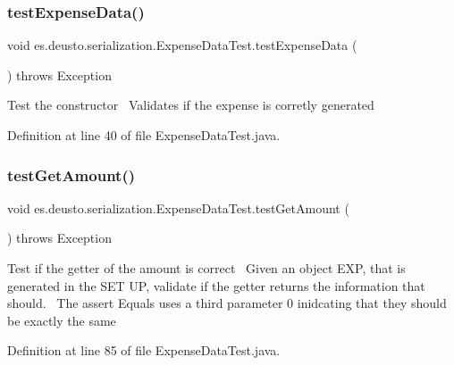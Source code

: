 \subsubsection{\texorpdfstring{test\+Expense\+Data()}{testExpenseData()}}
{\footnotesize\ttfamily void es.\+deusto.\+serialization.\+Expense\+Data\+Test.\+test\+Expense\+Data (\begin{DoxyParamCaption}{ }\end{DoxyParamCaption}) throws Exception}

Test the constructor~\newline
 Validates if the expense is corretly generated~\newline
 

Definition at line 40 of file Expense\+Data\+Test.\+java.

\mbox{\label{classes_1_1deusto_1_1serialization_1_1_expense_data_test_a23166488d596924308d8a4f800b15537}} 
\subsubsection{\texorpdfstring{test\+Get\+Amount()}{testGetAmount()}}
{\footnotesize\ttfamily void es.\+deusto.\+serialization.\+Expense\+Data\+Test.\+test\+Get\+Amount (\begin{DoxyParamCaption}{ }\end{DoxyParamCaption}) throws Exception}

Test if the getter of the amount is correct~\newline
Given an object E\+XP, that is generated in the S\+ET UP, validate if the getter returns the information that should.~\newline
The assert Equals uses a third parameter 0 inidcating that they should be exactly the same 

Definition at line 85 of file Expense\+Data\+Test.\+java.

\mbox{\label{classes_1_1deusto_1_1serialization_1_1_expense_data_test_a5f156cec176af911325693341f82b644}} 
